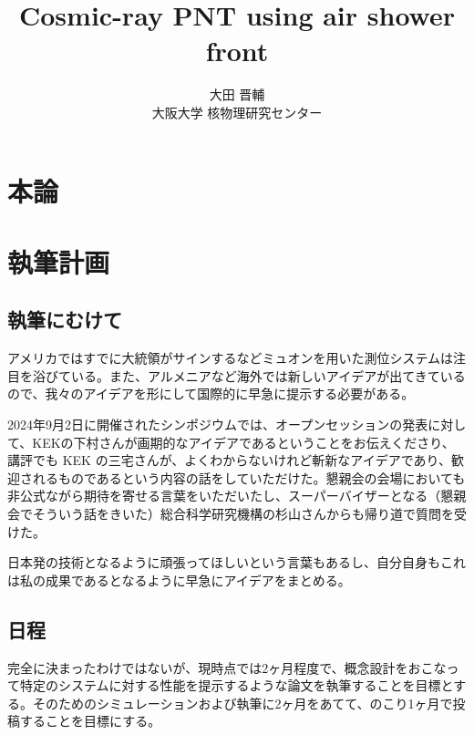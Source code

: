 \documentclass[uplatex]{jreport}
\title{Cosmic-ray PNT using air shower front}
\author{大田 晋輔 \\ 大阪大学 核物理研究センター}
\begin{document}
\dominitoc

\maketitle

\tableofcontents

\listoftodos
\clearpage
\chapter{本論}




\chapter{執筆計画}

\section{執筆にむけて}

アメリカではすでに大統領がサインするなどミュオンを用いた測位システムは注目を浴びている。また、アルメニアなど海外では新しいアイデアが出てきているので、我々のアイデアを形にして国際的に早急に提示する必要がある。

2024年9月2日に開催されたシンポジウムでは、オープンセッションの発表に対して、KEKの下村さんが画期的なアイデアであるということをお伝えくださり、講評でも KEK の三宅さんが、よくわからないけれど斬新なアイデアであり、歓迎されるものであるという内容の話をしていただけた。懇親会の会場においても非公式ながら期待を寄せる言葉をいただいたし、スーパーバイザーとなる（懇親会でそういう話をきいた）総合科学研究機構の杉山さんからも帰り道で質問を受けた。

日本発の技術となるように頑張ってほしいという言葉もあるし、自分自身もこれは私の成果であるとなるように早急にアイデアをまとめる。

\section{日程}

完全に決まったわけではないが、現時点では2ヶ月程度で、概念設計をおこなって特定のシステムに対する性能を提示するような論文を執筆することを目標とする。そのためのシミュレーションおよび執筆に2ヶ月をあてて、のこり1ヶ月で投稿することを目標にする。
\end{document}
